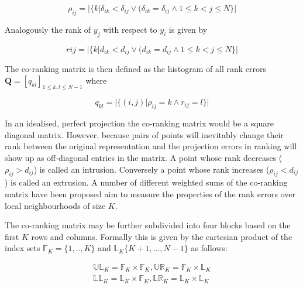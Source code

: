 \begin{equation}
	\rho_{ij} = |\{k | \delta_{ik} < \delta_{ij} \lor (\delta_{ik} = \delta_{ij} \land 1 \leq k < j \leq N\}|
\end{equation}

Analogously the rank of $y_j$ with respect to $y_i$ is given by

\begin{equation}
	r{ij} = |\{k | d_{ik} < d_{ij} \lor (d_{ik} = d_{ij} \land 1 \leq k < j \leq N\}|
\end{equation}

The co-ranking matrix is then defined as the histogram of all rank errors $\bm{Q} = [q_{kl}]_{1 \leq k, l \leq N-1}$ where

\begin{equation}
	q_{kl} = |\{(i,j) | \rho_{ij} = k \land r_{ij} = l\}|
\end{equation}

In an idealised, perfect projection the co-ranking matrix would be a square diagonal matrix. However, because pairs of points will inevitably change their rank between the original representation and the projection errors in ranking will show up as off-diagonal entries in the matrix. A point whose rank decreases ($\rho_{ij} > d_{ij}$)  is called an intrusion. Conversely a point whose rank increases ($\rho_{ij} < d_{ij}$) is called an extrusion. A number of different weighted sums of the co-ranking matrix have been proposed aim to measure the properties of the rank errors over local neighbourhoods of size $K$.

The co-ranking matrix may be further subdivided into four blocks based on the first $K$ rows and columns. Formally this is given by the cartesian product of the index sets $\mathbb{F}_K = \{1, .., K\}$ and $\mathbb{L}_K \{K+1, ..., N-1\}$ as follows:

\begin{align}
	\mathbb{UL}_K = \mathbb{F}_K \times \mathbb{F}_K,  \mathbb{UR}_K = \mathbb{F}_K \times \mathbb{L}_K
	\\
	\mathbb{LL}_K = \mathbb{L}_K \times \mathbb{F}_K,  \mathbb{LR}_K = \mathbb{L}_K \times \mathbb{L}_K
\end{align}

